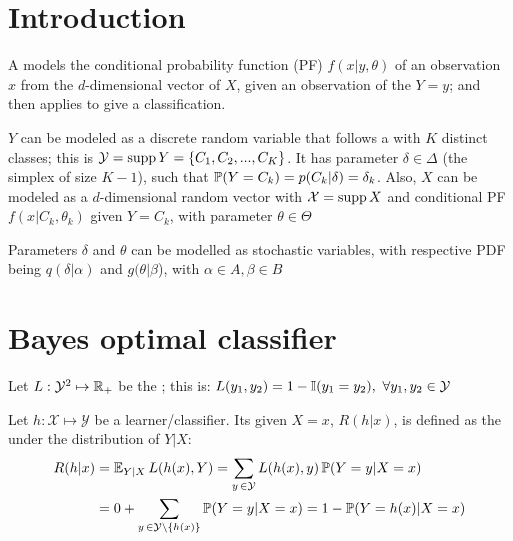 
\section{Introduction}

A  models the conditional probability function (PF) $f(x|y,{\theta})$ of an observation $x$ from the $d$-dimensional vector of  $X$, given an observation of the  $Y=y$; and then applies  to give a classification. 

$Y$ can be modeled as a discrete random variable that follows a 
 with $K$ distinct classes; this is $ \mathcal{Y}=\operatorname{supp}{Y}=\{C_1,C_2,...,C_K\}$. It has parameter $\delta\in\Delta$ (the simplex of size $K-1$), such that $\operatorname{\mathbb{P}}(Y=C_k)=p(C_k|\delta)=\delta_k$. Also, $X$ can be modeled as a $d$-dimensional random vector with $\mathcal{X}=\operatorname{supp} X$ and conditional PF $f(x|C_k,{\theta}_k)$ given $Y=C_k$, with parameter $\theta\in\Theta$

Parameters $\delta$ and $\theta$ can be modelled as stochastic variables, with respective PDF being $q(\delta|\alpha)$ and $g(\theta|\beta$), with  $\alpha\in A,\beta\in B$


\section{Bayes optimal classifier}

Let $L:\mathcal{Y}^2\mapsto\operatorname{\mathbb{R}}_+$ be the ; this is: $L(y_1,y_2) = 1-\I(y_1=y_2),\ \forall y_1,y_2\in\mathcal{Y}$

Let $h:\mathcal{X}\mapsto\mathcal{Y}$ be a {learner}/{classifier}. Its  given $X=x$, $R(h|x)$, is defined as the  under the distribution of $Y|X$:
\begin{align*}
    R(h|x) &= \operatorname{\mathbb{E}}_{Y|X} L(h(x),Y) = \sum_{y\,\in\mathcal{Y}} L(h({x}),y)\operatorname{\mathbb{P}}(Y=y|X={x}) \\
    &= 0+\sum_{y\,\in\mathcal{Y}\setminus\{h({x})\} } \operatorname{\mathbb{P}}(Y=y|X={x}) = 1 - \operatorname{\mathbb{P}}(Y=h(x)|X={x})
\end{align*}

